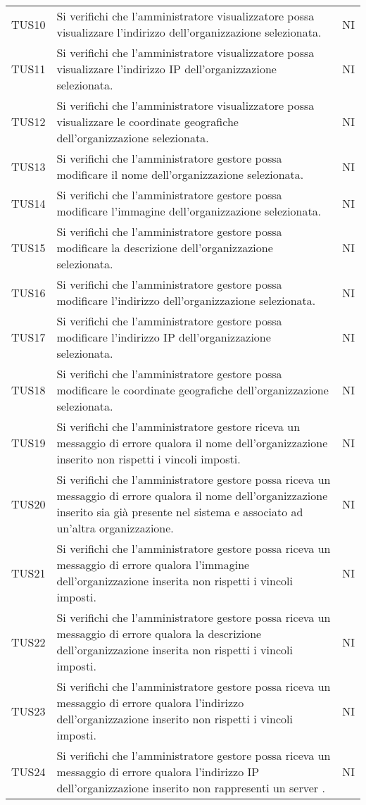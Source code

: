 {\begin{longtable}{ c C{13cm} C{1cm}}
TUS10 & Si verifichi che l'amministratore visualizzatore possa visualizzare l’indirizzo dell'organizzazione selezionata. & NI \\
TUS11 & Si verifichi che l'amministratore visualizzatore possa visualizzare l’indirizzo IP dell'organizzazione selezionata. & NI \\
TUS12 & Si verifichi che l'amministratore visualizzatore possa visualizzare le coordinate geografiche dell'organizzazione selezionata. & NI \\
TUS13 & Si verifichi che l'amministratore gestore possa modificare il nome dell'organizzazione selezionata. & NI \\
TUS14 & Si verifichi che l'amministratore gestore possa modificare l’immagine dell'organizzazione selezionata. & NI \\
TUS15 & Si verifichi che l'amministratore gestore possa modificare la descrizione dell'organizzazione selezionata. & NI \\
TUS16 & Si verifichi che l'amministratore gestore possa modificare l’indirizzo dell'organizzazione selezionata. & NI \\
TUS17 & Si verifichi che l'amministratore gestore possa modificare l’indirizzo IP dell'organizzazione selezionata. & NI \\
TUS18 & Si verifichi che l'amministratore gestore possa modificare le coordinate geografiche dell'organizzazione selezionata. & NI \\
TUS19 & Si verifichi che l'amministratore gestore riceva un messaggio di errore qualora il nome dell'organizzazione inserito non rispetti i vincoli imposti. & NI \\
TUS20 & Si verifichi che l'amministratore gestore possa riceva un messaggio di errore qualora il nome dell'organizzazione inserito sia già presente nel sistema e associato ad un'altra organizzazione. & NI \\
TUS21 & Si verifichi che l'amministratore gestore possa riceva un messaggio di errore qualora l'immagine dell'organizzazione inserita non rispetti i vincoli imposti. & NI \\
TUS22 & Si verifichi che l'amministratore gestore possa riceva un messaggio di errore qualora la descrizione dell'organizzazione inserita non rispetti i vincoli imposti. & NI \\
TUS23 & Si verifichi che l'amministratore gestore possa riceva un messaggio di errore qualora l'indirizzo dell'organizzazione inserito non rispetti i vincoli imposti. & NI \\
TUS24 & Si verifichi che l'amministratore gestore possa riceva un messaggio di errore qualora l'indirizzo IP dell'organizzazione inserito non rappresenti un server . & NI \\

\end{longtable}}
